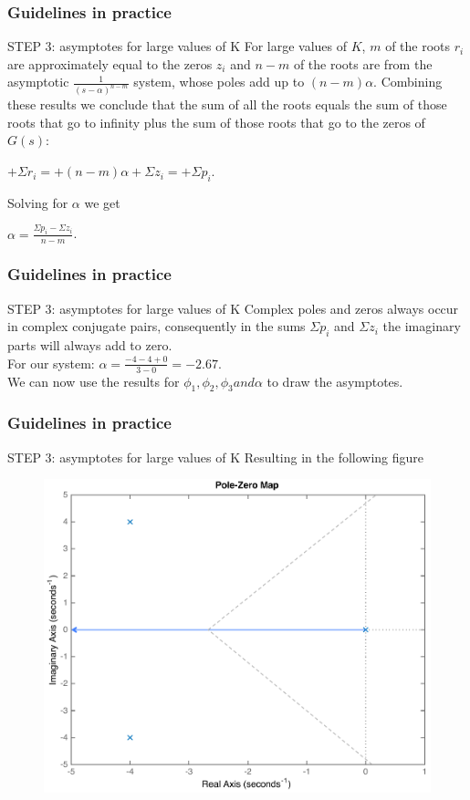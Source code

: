\begin{frame}
	\frametitle{Guidelines in practice}
	\begin{block}{STEP 3: asymptotes for large values of K}
		For large values of $K$, $m$ of the roots $r_i$ are approximately equal to the zeros $z_i$ and $n-m$ of the roots are from the asymptotic $\frac{1}{(s-\alpha)^{n-m}}$ system, whose poles add up to $(n-m)\alpha$. Combining these results we conclude that the sum of all the roots equals the sum of those roots that go to infinity plus the sum of those roots that go to the zeros of $G(s)$:
		\begin{center}
			$+\Sigma r_i = + (n-m)\alpha + \Sigma z_i = +\Sigma p_i$.
		\end{center}
		Solving for $\alpha$ we get 
		\begin{center}
			$\alpha = \frac{\Sigma p_i - \Sigma z_i}{n-m}$.
		\end{center}
	\end{block}
\end{frame}

\begin{frame}
	\frametitle{Guidelines in practice}
	\begin{block}{STEP 3: asymptotes for large values of K}
		Complex poles and zeros always occur in complex conjugate pairs, consequently in the sums $\Sigma p_i$ and $\Sigma z_i$ the imaginary parts will always add to zero.\\
		\vspace{1em}
		For our system: $\alpha = \frac{-4-4+0}{3-0} = -2.67.$\\
		\vspace{1em}
		We can now use the results for $\phi_1, \phi_2, \phi_3 and \alpha$ to draw the asymptotes. 
	\end{block}
\end{frame}

\begin{frame}
\frametitle{Guidelines in practice}
	\begin{block}{STEP 3: asymptotes for large values of K}
		Resulting in the following figure
		\vspace{-0.5em}
		\begin{figure}
			\centering
			\includegraphics[width=0.6\linewidth]{how_to_draw_ex3}
		\end{figure}
	\end{block}
\end{frame}

